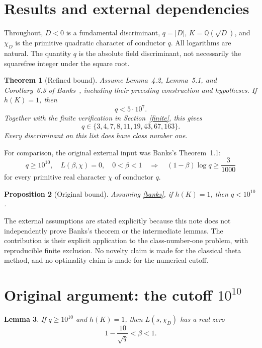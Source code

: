 \documentclass[11pt]{article}
\newtheorem{theorem}{Theorem}
\newtheorem{lemma}[theorem]{Lemma}
\newtheorem{proposition}[theorem]{Proposition}
\newcommand{\Q}{\mathbb Q}
\newcommand{\norm}[1]{\lvert #1\rvert}
\begin{document}
\section{Results and external dependencies}

Throughout, \(D<0\) is a fundamental discriminant,
\(q=\norm D\), \(K=\Q(\sqrt D)\), and \(\chi_D\) is the primitive
quadratic character of conductor \(q\). All logarithms are natural.
The quantity \(q\) is the absolute field discriminant, not necessarily
the squarefree integer under the square root.

\begin{theorem}[Refined bound]\label{main}
Assume Lemma~4.2, Lemma~5.1, and Corollary~6.3 of Banks~\cite{banks},
including their preceding construction and hypotheses.
If \(h(K)=1\), then
\[
 q<5\cdot10^7.
\]
Together with the finite verification in Section~\ref{finite}, this gives
\[
 q\in\{3,4,7,8,11,19,43,67,163\}.
\]
Every discriminant on this list does have class number one.
\end{theorem}

For comparison, the original external input was Banks's Theorem~1.1:
\begin{equation}\label{banks}
 q\ge10^{10},\quad L(\beta,\chi)=0,\quad 0<\beta<1
 \quad\Longrightarrow\quad
 (1-\beta)\log q\ge\frac3{1000}
\end{equation}
for every primitive real character \(\chi\) of conductor \(q\).

\begin{proposition}[Original bound]\label{baseline}
Assuming \eqref{banks}, if \(h(K)=1\), then \(q<10^{10}\).
\end{proposition}

The external assumptions are stated explicitly because this note does
not independently prove Banks's theorem or the intermediate lemmas.
The contribution is their explicit application to the class-number-one
problem, with reproducible finite exclusion. No novelty claim is made
for the classical theta method, and no optimality claim is made for
the numerical cutoff.

\section{Original argument: the cutoff \texorpdfstring{\(10^{10}\)}{10 to the tenth power}}\label{sec-baseline}

\begin{lemma}\label{zero}
If \(q\ge10^{10}\) and \(h(K)=1\), then \(L(s,\chi_D)\) has a real zero
\[
 1-\frac{10}{\sqrt q}<\beta<1.
\]
\end{lemma}
\end{document}
